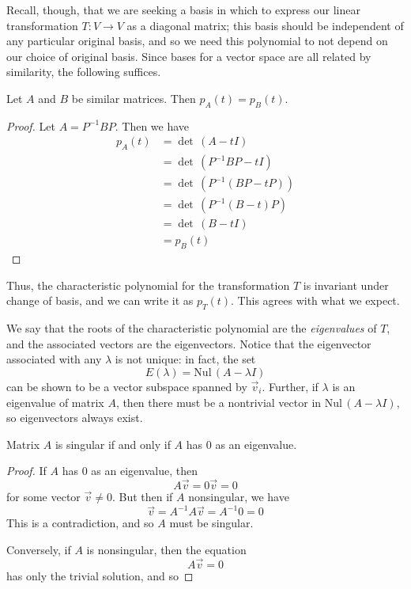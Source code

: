 Recall, though, that we are seeking a basis in which to express our linear transformation $T:V\rightarrow V$ as a diagonal matrix; this basis should be independent of any particular original basis, and so we need this polynomial to not depend on our choice of original basis. Since bases for a vector space are all related by similarity, the following suffices.

\begin{prop}
Let $A$ and $B$ be similar matrices. Then $p_A\left(t\right) = p_B\left(t\right)$.
\end{prop}
\begin{proof}
Let $A = P^{-1}BP$. Then we have
\begin{align*}
	p_A\left(t\right) & = \det \, \left(A-tI\right) \\
	& = \det \, \left( P^{-1}BP - tI \right) \\
	& = \det \, \left( P^{-1} \left(BP - tP\right) \right) \\
	& = \det \, \left(P^{-1} \left(B - t\right) P \right) \\
	& = \det \, \left(B-tI\right) \\
	& = p_B\left( t\right) 
\end{align*}
\end{proof}
Thus, the characteristic polynomial for the transformation $T$ is invariant under change of basis, and we can write it as $p_T\left(t\right)$. This agrees with what we expect.

We say that the roots of the characteristic polynomial are the \textit{eigenvalues} of $T$, and the associated vectors are the eigenvectors. Notice that the eigenvector associated with any $\lambda$ is not unique: in fact, the set \[ E\left(\lambda\right) = \text{Nul}\, \left(A-\lambda I\right) \] can be shown to be a vector subspace spanned by $\vec{v}_i$. Further, if $\lambda$ is an eigenvalue of matrix $A$, then there must be a nontrivial vector in $\text{Nul}\,\left(A-\lambda I\right)$, so eigenvectors always exist. 


\begin{prop}
Matrix $A$ is singular if and only if $A$ has $0$ as an eigenvalue.
\end{prop}
\begin{proof}
If $A$ has $0$ as an eigenvalue, then \[ A\vec{v} = 0\vec{v} = 0 \] for some vector $\vec{v} \neq 0$. But then if $A$ nonsingular, we have \[ \vec{v} = A^{-1}A\vec{v} = A^{-1}0 = 0 \] This is a contradiction, and so $A$ must be singular.

Conversely, if $A$ is nonsingular, then the equation \[ A\vec{v} = 0 \] has only the trivial solution, and so 
\end{proof}



